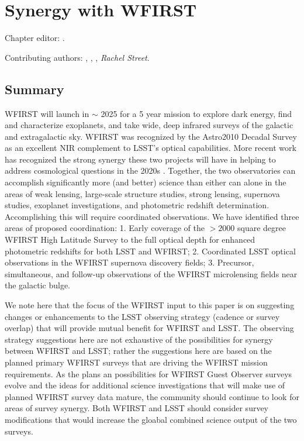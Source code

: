 \chapter[Synergy with WFIRST]{Synergy with WFIRST}
\def\chpname{wfirst}\label{chp:\chpname}

Chapter editor:
.

Contributing authors:
,
,
,
{\it Rachel Street}.

\section*{Summary}

WFIRST will launch in $\sim$ 2025 for a 5 year mission to explore dark energy, find and characterize exoplanets, and take wide, deep infrared surveys of the galactic and extragalactic sky.  WFIRST was recognized by the Astro2010 Decadal Survey as an excellent NIR complement to LSST's optical capabilities. More recent work has recognized the strong synergy these two projects will have in helping to address cosmological questions in the 2020s \citep{2015arXiv150107897J}.
  Together, the two observatories can accomplish significantly more (and better) science than either can alone in the areas of weak lensing, large-scale structure studies, strong lensing, supernova studies, exoplanet investigations,  and photometric redshift determination. Accomplishing this will require coordinated observations.  We have identified three areas of proposed coordination: 1. Early coverage of the $>2000$ square degree WFIRST High Latitude Survey to the full optical depth for enhanced photometric redshifts for both LSST and WFIRST; 2. Coordinated LSST optical observations in the WFIRST supernova discovery fields; 3. Precursor, simultaneous, and follow-up observations of the WFIRST microlensing fields near the galactic bulge. 
  
  We note here that the focus of the WFIRST  input to this paper is on suggesting changes or enhancements to the LSST observing strategy (cadence or survey overlap) that will provide mutual benefit for WFIRST and LSST.  The observing strategy suggestions here are not exhaustive of the possibilities for synergy between WFIRST and LSST; rather the suggestions here are based on the planned primary WFIRST surveys that are driving the WFIRST mission requirements.  As the plans an possibilities for WFIRST Guest Observer surveys evolve and the ideas for additional science investigations that will make use of planned WFIRST survey data mature, the community should continue to look for areas of survey synergy.  Both WFIRST and LSST should consider survey modifications that would increase the gloabal combined science output of the two surveys. 


